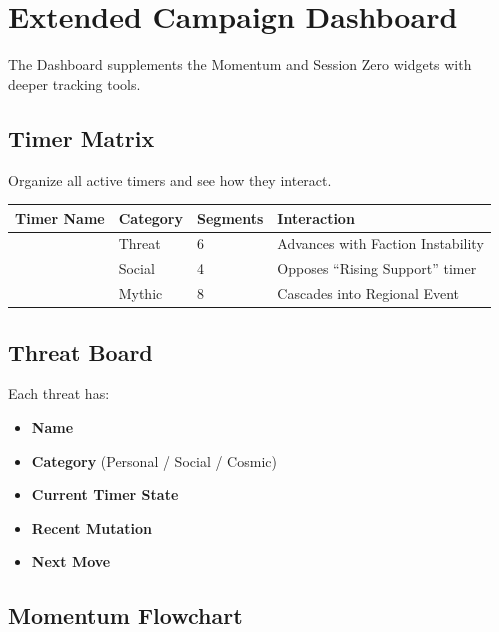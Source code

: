 \documentclass[11pt]{article}
\begin{document}

\section{Extended Campaign Dashboard}
\label{appendix:dashboard}

The Dashboard supplements the Momentum and Session Zero widgets with deeper tracking tools.

\subsection{Timer Matrix}

Organize all active timers and see how they interact.

\begin{center}
\begin{longtable}{|p{4cm}|p{3cm}|p{3cm}|p{3cm}|}
\hline
\textbf{Timer Name} & \textbf{Category} & \textbf{Segments} & \textbf{Interaction} \\
\hline
\phantom{XXXX} & Threat & 6 & Advances with Faction Instability \\
\phantom{XXXX} & Social & 4 & Opposes ``Rising Support'' timer \\
\phantom{XXXX} & Mythic & 8 & Cascades into Regional Event \\
\hline
\end{longtable}
\end{center}

\subsection{Threat Board}

Each threat has:
\begin{itemize}
    \item \textbf{Name}
    \item \textbf{Category} (Personal / Social / Cosmic)
    \item \textbf{Current Timer State}
    \item \textbf{Recent Mutation}
    \item \textbf{Next Move}
\end{itemize}

\subsection{Momentum Flowchart}
\end{document}
